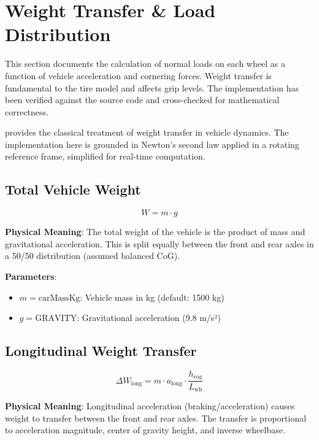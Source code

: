 \section{Weight Transfer \& Load Distribution}

This section documents the calculation of normal loads on each wheel as a function of vehicle acceleration and cornering forces. Weight transfer is fundamental to the tire model and affects grip levels. The implementation has been verified against the source code and cross-checked for mathematical correctness.

\cite{milliken1995race} provides the classical treatment of weight transfer in vehicle dynamics. The implementation here is grounded in Newton's second law applied in a rotating reference frame, simplified for real-time computation.

\subsection{Total Vehicle Weight}

\begin{equation}
  W = m \cdot g
  \label{eq:total-weight}
\end{equation}

\textbf{Physical Meaning}: The total weight of the vehicle is the product of mass and gravitational acceleration. This is split equally between the front and rear axles in a 50/50 distribution (assumed balanced CoG).

\textbf{Parameters}:
\begin{itemize}
  \item $m = \mathrm{carMassKg}$: Vehicle mass in kg (default: 1500 kg)
  \item $g = \mathrm{GRAVITY}$: Gravitational acceleration (9.8 m/s²)
\end{itemize}

\subsection{Longitudinal Weight Transfer}

\begin{equation}
  \Delta W_{\text{long}} = m \cdot a_{\text{long}} \cdot \frac{h_{\text{cog}}}{L_{\text{wb}}}
  \label{eq:longitudinal-transfer}
\end{equation}

\textbf{Physical Meaning}: Longitudinal acceleration (braking/acceleration) causes weight to transfer between the front and rear axles. The transfer is proportional to acceleration magnitude, center of gravity height, and inverse wheelbase.

